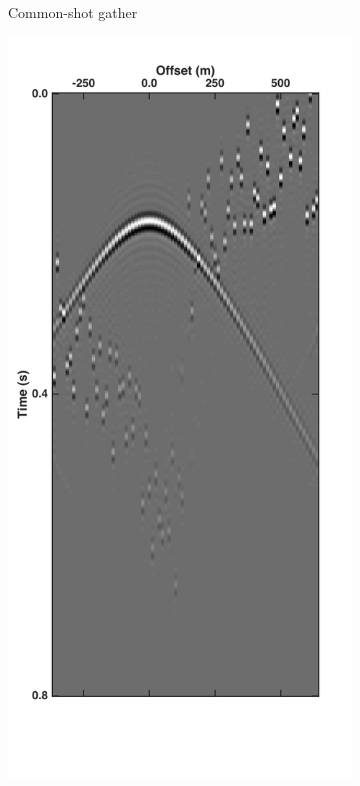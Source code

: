 \begin{figure}
\begin{subfigure}[t]{0.25\textwidth}
		\caption{Common-shot gather}
		\label{fig:Ch-Theory-PseudoDeblendedCSG}
	\end{subfigure}
	\centering
	\begin{subfigure}[t]{0.25\textwidth}
		\includegraphics[width=\textwidth]{Plots/Mahdad/30iter/Pseudo-DeblendedCRG_rec30}	

\end{subfigure}
\end{figure}
